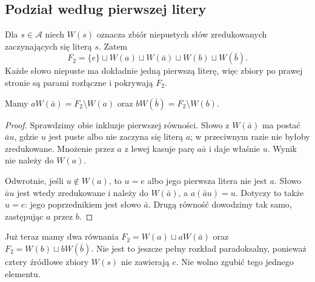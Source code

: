 \subsection{Podział według pierwszej litery}
Dla $s\in\mathcal A$ niech $W(s)$ oznacza zbiór niepustych słów zredukowanych zaczynających się literą $s$. Zatem
\begin{equation}\label{eq:4-1}
 F_2=\{e\}\sqcup W(a)\sqcup W(\bar a)\sqcup W(b)\sqcup W(\bar b).
\end{equation}
Każde słowo niepuste ma dokładnie jedną pierwszą literę, więc zbiory po prawej stronie są parami rozłączne i pokrywają $F_2$.
\begin{lemat}\label{lem:pierwsza-litera}
Mamy $aW(\bar a)=F_2\setminus W(a)$ oraz $bW(\bar b)=F_2\setminus W(b)$.
\end{lemat}
\begin{proof}
Sprawdzimy obie inkluzje pierwszej równości. Słowo z $W(\bar a)$ ma postać $\bar au$, gdzie $u$ jest puste albo nie zaczyna się literą $a$; w przeciwnym razie nie byłoby zredukowane. Mnożenie przez $a$ z lewej kasuje parę $a\bar a$ i daje właśnie $u$. Wynik nie należy do $W(a)$.

Odwrotnie, jeśli $u\notin W(a)$, to $u=e$ albo jego pierwsza litera nie jest $a$. Słowo $\bar au$ jest wtedy zredukowane i należy do $W(\bar a)$, a $a(\bar au)=u$. Dotyczy to także $u=e$: jego poprzednikiem jest słowo $\bar a$. Drugą równość dowodzimy tak samo, zastępując $a$ przez $b$.
\end{proof}
Już teraz mamy dwa równania $F_2=W(a)\sqcup aW(\bar a)$ oraz $F_2=W(b)\sqcup bW(\bar b)$. Nie jest to jeszcze pełny rozkład paradoksalny, ponieważ cztery źródłowe zbiory $W(s)$ nie zawierają $e$. Nie wolno zgubić tego jednego elementu.

